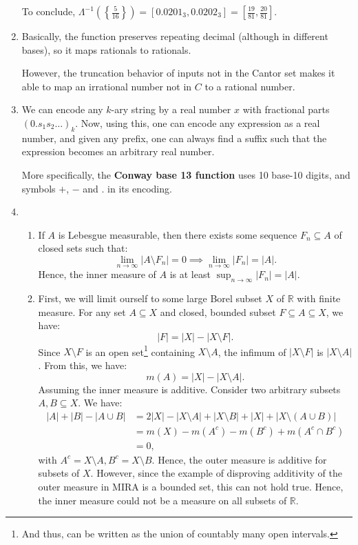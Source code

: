 \begin{enumerate}[label=\textbf{2D.\arabic*}]
To conclude, \( \Lambda^{-1} \left( \left\{ \frac{5}{16} \right\}  \right) =
[0.0201_{3}, 0.0202_{3}] = \left[ \frac{19}{81}, \frac{20}{81} \right]  \).

\item Basically, the function preserves repeating decimal (although in different
  bases), so it maps rationals to rationals.

  However, the truncation behavior of inputs not in the Cantor set makes it able
  to map an irrational number not in \( C \) to a rational number.

\item 
  We can encode any \( k \)-ary string by a real number \( x \) with fractional
  parts \( (0.s_{1}s_{2}\ldots)_{k} \). Now, using this, one can encode any
  expression as a real number, and given any prefix, one can always find a
  suffix such that the expression becomes an arbitrary real number.

  More specifically, the \textbf{Conway base 13 function} uses 10 base-10
  digits, and symbols \( + \), \( - \) and \( . \) in its encoding.

\item 
  \begin{enumerate}[label=(\alph*)]
    \item 
  If \( A \) is Lebesgue measurable, then there exists some sequence \(
  F_{n} \subseteq A \) of closed sets such that:
  \[
    \lim_{n \to \infty} |A \setminus F_{n}| = 0 \implies \lim_{n \to \infty}
    |F_{n}| = |A|
  .\] 
  Hence, the inner measure of \( A \) is at least \( \sup_{n \to \infty} |F_{n}|
  = |A|\).

\item 
  First, we will limit ourself to some large Borel subset \( X \) of \( \mathbb{R} \)
  with finite measure. For any set \( A \subseteq X \) and closed, bounded
  subset \( F \subseteq A \subseteq X \), we have:
  \[
    |F| = |X| - |X \setminus F|
  .\] 
  Since \( X \setminus F \) is an open set\footnote{And thus, can be written as
  the union of countably many open intervals.} containing \( X  \setminus A \),
  the infimum of \( |X \setminus F| \) is \( |X \setminus A| \). From this, we
  have:
  \[
    m(A) = |X| - |X \setminus A|
  .\] 
  Assuming the inner measure is additive.
  Consider two arbitrary subsets \( A, B \subseteq X \). We have:
  \begin{align*}
    |A| + |B| - |A \cup B| &= 2|X| - |X \setminus A| + |X \setminus B| + |X| + |X
    \setminus (A \cup B)|\\
    &= m(X) - m(A^{c}) - m(B^{c}) + m(A^{c} \cap B^{c}) \\
    &= 0
  ,\end{align*} with \( A^{c} = X \setminus A, B^{c} = X \setminus B \).
  Hence, the outer measure is additive for subsets of \( X \). However, since
  the example of disproving additivity of the outer measure in MIRA is a bounded
  set, this can not hold true. Hence, the inner measure could not be a measure
  on all subsets of \( \mathbb{R} \).
\end{enumerate}

  
\end{enumerate}

